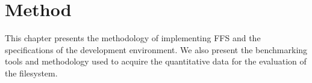 
\chapter{Method}
\label{ch:methods}

This chapter presents the methodology of implementing \gls{FFS} and the specifications of the development environment. We also present the benchmarking tools and methodology used to acquire the quantitative data for the evaluation of the filesystem.





